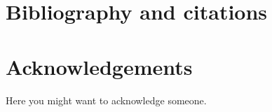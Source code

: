 \documentclass[11pt,a4paper]{article}
\begin{document}












\section{Bibliography and citations}





\cleardoublepage



\section*{Acknowledgements}
Here you might want to acknowledge someone.

\end{document}
